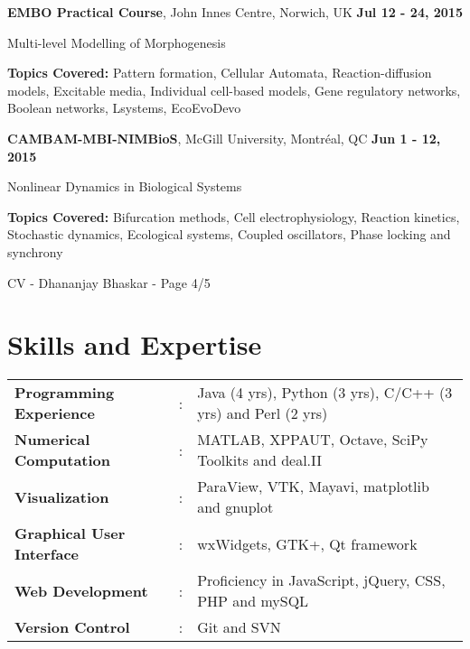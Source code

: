 \documentclass[margin,line]{res}
\newenvironment{list1}{
  \begin{list}{\ding{113}}{
      \setlength{\itemsep}{0in}
      \setlength{\parsep}{0in} \setlength{\parskip}{0in}
      \setlength{\topsep}{0in} \setlength{\partopsep}{0in} 
      \setlength{\leftmargin}{0.17in}}}{\end{list}}
\begin{document}
\begin{resume}
{\bf EMBO Practical Course}, John Innes Centre, Norwich, UK  \hfill {\bf Jul 12 - 24, 2015}\\
\vspace*{-.2cm}
\begin{list1}
\item[] Multi-level Modelling of Morphogenesis
\vspace*{0.2cm}
\item[] {\bf Topics Covered:} Pattern formation, Cellular Automata, Reaction-diffusion models, Excitable media, Individual cell-based models, Gene regulatory networks, Boolean networks, L{\textendash}systems, Eco{\textendash}Evo{\textendash}Devo
\end{list1}

{\bf CAMBAM-MBI-NIMBioS}, McGill University, Montr\'eal, QC \hfill {\bf Jun 1 - 12, 2015}\\
\vspace*{-.2cm}
\begin{list1}
\item[] Nonlinear Dynamics in Biological Systems
\vspace*{0.2cm}
\item[] {\bf Topics Covered:} Bifurcation methods, Cell electrophysiology, Reaction kinetics, Stochastic dynamics, Ecological systems, Coupled oscillators, Phase locking and synchrony
\end{list1}

\newpage
\begin{flushright}
CV - Dhananjay Bhaskar - Page 4/5
\end{flushright}
\vspace*{.2cm}

\section{\sc Skills and Expertise}

\begin{tabular}{@{}p{4.5cm}p{0.1cm}p{10.5cm}}
{\bf Programming Experience}&:& Java (4 yrs), Python (3 yrs), C/C++ (3 yrs) and Perl (2 yrs)\\[0.2cm]
{\bf Numerical Computation}&:& MATLAB, XPPAUT, Octave, SciPy Toolkits and deal.II\\[0.2cm]
{\bf Visualization}&:& ParaView, VTK, Mayavi, matplotlib and gnuplot\\[0.2cm]
{\bf Graphical User Interface}&:& wxWidgets, GTK+, Qt framework\\[0.2cm]
{\bf Web Development}&:& Proficiency in JavaScript, jQuery, CSS, PHP and mySQL\\[0.2cm]
{\bf Version Control}&:& Git and SVN
\end{tabular}


\end{resume}
\end{document}
